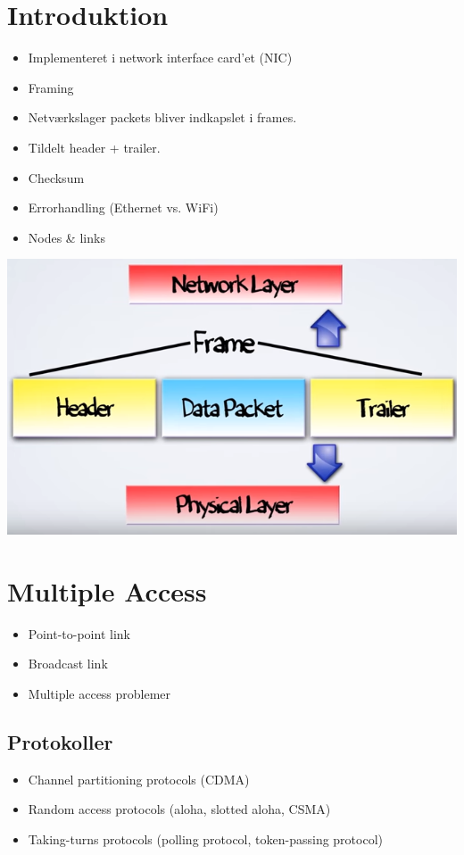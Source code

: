 \section{Introduktion}
\begin{itemize}
	\item Implementeret i network interface card'et (NIC)
	\item Framing
	\item Netværkslager packets bliver indkapslet i frames.
	\item Tildelt header + trailer.
	\item Checksum
	\item Errorhandling (Ethernet vs. WiFi)
	\item Nodes \& links
\end{itemize}

{\includegraphics{5-data-link-layer/framing.png}

\section{Multiple Access}
\begin{itemize}
	\item Point-to-point link
	\item Broadcast link
	\item Multiple access problemer
\end{itemize}

\subsection{Protokoller}
\begin{itemize}
	\item Channel partitioning protocols (CDMA)
	\item Random access protocols (aloha, slotted aloha, CSMA)
	\item Taking-turns protocols (polling protocol, token-passing protocol)
\end{itemize}

}
